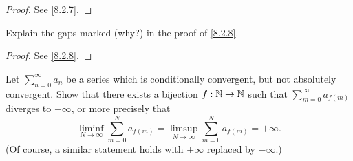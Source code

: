 \begin{proof}
	See \cref{8.2.7}.
\end{proof}

\begin{ex}\label{ex:8.2.5}
	Explain the gaps marked (why?) in the proof of \cref{8.2.8}.
\end{ex}

\begin{proof}
	See \cref{8.2.8}.
\end{proof}

\begin{ex}\label{ex:8.2.6}
	Let \(\sum_{n = 0}^\infty a_n\) be a series which is conditionally convergent, but not absolutely convergent.
	Show that there exists a bijection \(f : \mathbb{N} \to \mathbb{N}\) such that \(\sum_{m = 0}^\infty a_{f(m)}\) diverges to \(+\infty\), or more precisely that
	\[
		\liminf_{N \to \infty} \sum_{m = 0}^N a_{f(m)} = \limsup_{N \to \infty} \sum_{m = 0}^N a_{f(m)} = +\infty.
	\]
	(Of course, a similar statement holds with \(+\infty\) replaced by \(-\infty\).)
\end{ex}

